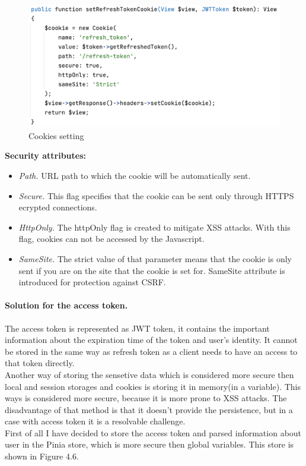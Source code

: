 \begin{figure}[h]
\centering
\includegraphics[scale=0.6]{../png/cookies.png}
\caption{Cookies setting}
\end{figure}

\noindent \textbf{Security attributes:}

\begin{itemize}
    \item \emph{Path.} URL path to which the cookie will be automatically sent.
    \item \emph{Secure.} This flag specifies that the cookie can be sent only through HTTPS ecrypted connections.
    \item \emph{HttpOnly.} The httpOnly flag is created to mitigate XSS attacks. With this flag, cookies can not be accessed by the Javascript.
    \item \emph{SameSite.} The strict value of that parameter means that the cookie is only sent if you are on the site that the cookie is set for. SameSite attribute is introduced for protection against CSRF. 
\end{itemize}



\paragraph*{Solution for the access token.} The access token is represented as JWT token, it contains the important information about the expiration time of the token and user's identity. It cannot be stored in the same way as refresh token as a client needs to have an access to that token directly.\\
Another way of storing the sensetive data which is considered more secure then local and session storages and cookies is storing it in memory(in a variable). This ways is considered more secure, because it is more prone to XSS attacks. The disadvantage of that method is that it doesn't provide the persistence, but in a case with access token it is a resolvable challenge.\\
First of all I have decided to store the access token and parsed information about user in the Pinia store, which is more secure then global variables. This store is shown in Figure 4.6.


